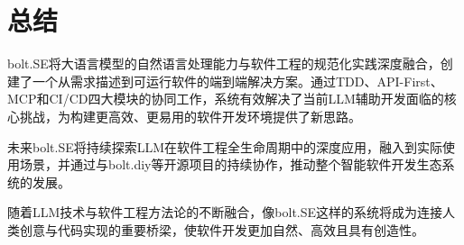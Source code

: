 \section{总结}

bolt.SE将大语言模型的自然语言处理能力与软件工程的规范化实践深度融合，创建了一个从需求描述到可运行软件的端到端解决方案。通过TDD、API-First、MCP和CI/CD四大模块的协同工作，系统有效解决了当前LLM辅助开发面临的核心挑战，为构建更高效、更易用的软件开发环境提供了新思路。

未来bolt.SE将持续探索LLM在软件工程全生命周期中的深度应用，融入到实际使用场景，并通过与bolt.diy等开源项目的持续协作，推动整个智能软件开发生态系统的发展。

随着LLM技术与软件工程方法论的不断融合，像bolt.SE这样的系统将成为连接人类创意与代码实现的重要桥梁，使软件开发更加自然、高效且具有创造性。 